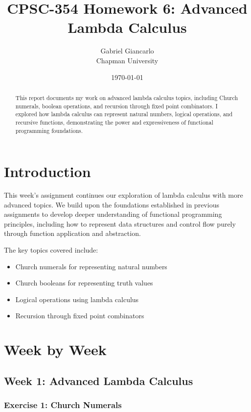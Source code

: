 \documentclass{article}
\title{CPSC-354 Homework 6: Advanced Lambda Calculus}
\author{Gabriel Giancarlo \\ Chapman University}
\date{\today}
\theoremstyle{plain}
\theoremstyle{definition}
\theoremstyle{remark}
\begin{document}
\maketitle

\begin{abstract}
This report documents my work on advanced lambda calculus topics, including Church numerals, boolean operations, and recursion through fixed point combinators. I explored how lambda calculus can represent natural numbers, logical operations, and recursive functions, demonstrating the power and expressiveness of functional programming foundations.
\end{abstract}

\setcounter{tocdepth}{3}
\tableofcontents

\section{Introduction}\label{intro}

This week's assignment continues our exploration of lambda calculus with more advanced topics. We build upon the foundations established in previous assignments to develop deeper understanding of functional programming principles, including how to represent data structures and control flow purely through function application and abstraction.

The key topics covered include:
\begin{itemize}
\item Church numerals for representing natural numbers
\item Church booleans for representing truth values
\item Logical operations using lambda calculus
\item Recursion through fixed point combinators
\end{itemize}

\section{Week by Week}\label{homework}

\subsection{Week 1: Advanced Lambda Calculus}

\subsubsection{Exercise 1: Church Numerals}
\end{document}
